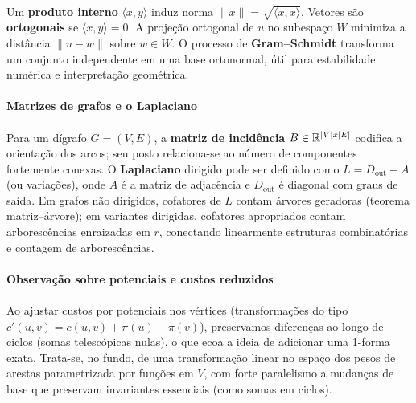 \documentclass[12pt,a4paper]{article}
\def\emph#1{#1}%
\def\times{\string x}%
\begin{document}
\paragraph{}
Um \textbf{produto interno} $\langle x,y\rangle$ induz norma $\|x\|=\sqrt{\langle x,x\rangle}$. Vetores são \textbf{ortogonais} se $\langle x,y\rangle=0$. A projeção ortogonal de $u$ no subespaço $W$ minimiza a distância $\|u-w\|$ sobre $w\in W$. O processo de \textbf{Gram--Schmidt} transforma um conjunto independente em uma base ortonormal, útil para estabilidade numérica e interpretação geométrica.

\paragraph{Matrizes de grafos e o Laplaciano}
\paragraph{}
Para um dígrafo $G=(V,E)$, a \textbf{matriz de incidência} $B\in\mathbb{R}^{|V|\times |E|}$ codifica a orientação dos arcos; seu posto relaciona-se ao número de componentes fortemente conexas. O \textbf{Laplaciano} dirigido pode ser definido como $L=D_{\text{out}}-A$ (ou variações), onde $A$ é a matriz de adjacência e $D_{\text{out}}$ é diagonal com graus de saída. Em grafos não dirigidos, cofatores de $L$ contam árvores geradoras (\emph{teorema matriz--árvore}); em variantes dirigidas, cofatores apropriados contam arborescências enraizadas em $r$, conectando linearmente estruturas combinatórias e contagem de arborescências.

\paragraph{Observação sobre potenciais e custos reduzidos}
\paragraph{}
Ao ajustar custos por \emph{potenciais} nos vértices (transformações do tipo $c'(u,v)=c(u,v)+\pi(u)-\pi(v)$), preservamos diferenças ao longo de ciclos (somas telescópicas nulas), o que ecoa a ideia de adicionar uma 1-forma exata. Trata-se, no fundo, de uma transformação linear no espaço dos pesos de arestas parametrizada por funções em $V$, com forte paralelismo a mudanças de base que preservam invariantes essenciais (como somas em ciclos).


\bigskip
\printbibliography
\end{document}
